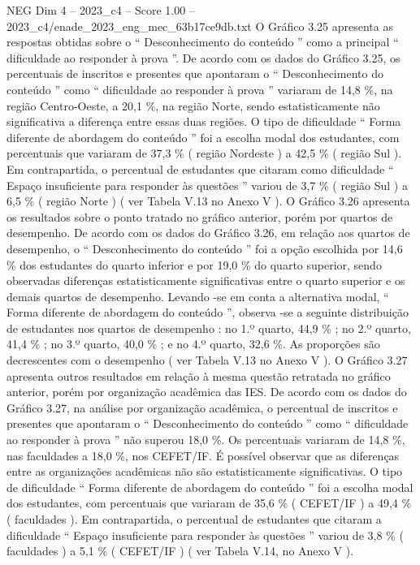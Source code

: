 \begin{textsample}{NEG Dim 4 – 2023\_c4 – Score 1.00 – 2023\_c4/enade\_2023\_eng\_mec\_63b17ce9db.txt}
O Gráfico 3.25 apresenta as respostas obtidas sobre o “ Desconhecimento do conteúdo ” como a principal “ dificuldade ao responder à prova ”.
De acordo com os dados do Gráfico 3.25, os percentuais de inscritos e presentes que apontaram o “ Desconhecimento do conteúdo ” como “ dificuldade ao responder à prova ” variaram de 14,8 \%, na região Centro-Oeste, a 20,1 \%, na região Norte, sendo estatisticamente não significativa a diferença entre essas duas regiões.
O tipo de dificuldade “ Forma diferente de abordagem do conteúdo ” foi a escolha modal dos estudantes, com percentuais que variaram de 37,3 \% ( região Nordeste ) a 42,5 \% ( região Sul ).
Em contrapartida, o percentual de estudantes que citaram como dificuldade “ Espaço insuficiente para responder às questões ” variou de 3,7 \% ( região Sul ) a 6,5 \% ( região Norte ) ( ver Tabela V.13 no Anexo V ).
O Gráfico 3.26 apresenta os resultados sobre o ponto tratado no gráfico anterior, porém por quartos de desempenho.
De acordo com os dados do Gráfico 3.26, em relação aos quartos de desempenho, o “ Desconhecimento do conteúdo ” foi a opção escolhida por 14,6 \% dos estudantes do quarto inferior e por 19,0 \% do quarto superior, sendo observadas diferenças estatisticamente significativas entre o quarto superior e os demais quartos de desempenho.
Levando -se em conta a alternativa modal, “ Forma diferente de abordagem do conteúdo ”, observa -se a seguinte distribuição de estudantes nos quartos de desempenho : no 1.º quarto, 44,9 \% ; no 2.º quarto, 41,4 \% ; no 3.º quarto, 40,0 \% ; e no 4.º quarto, 32,6 \%.
As proporções são decrescentes com o desempenho ( ver Tabela V.13 no Anexo V ).
O Gráfico 3.27 apresenta outros resultados em relação à mesma questão retratada no gráfico anterior, porém por organização acadêmica das IES.
De acordo com os dados do Gráfico 3.27, na análise por organização acadêmica, o percentual de inscritos e presentes que apontaram o “ Desconhecimento do conteúdo ” como “ dificuldade ao responder à prova ” não superou 18,0 \%.
Os percentuais variaram de 14,8 \%, nas faculdades a 18,0 \%, nos CEFET/IF.
É possível observar que as diferenças entre as organizações acadêmicas não são estatisticamente significativas.
O tipo de dificuldade “ Forma diferente de abordagem do conteúdo ” foi a escolha modal dos estudantes, com percentuais que variaram de 35,6 \% ( CEFET/IF ) a 49,4 \% ( faculdades ).
Em contrapartida, o percentual de estudantes que citaram a dificuldade “ Espaço insuficiente para responder às questões ” variou de 3,8 \% ( faculdades ) a 5,1 \% ( CEFET/IF ) ( ver Tabela V.14, no Anexo V ).

\end{textsample}
